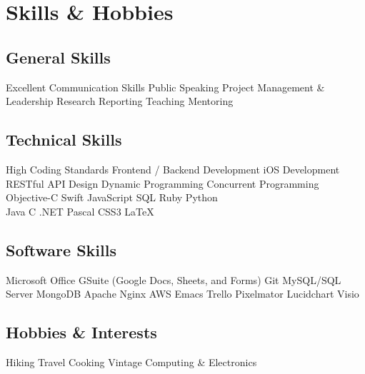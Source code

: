 \vspace{-2\bigskipamount}
\section{Skills \& Hobbies}
\small

\subsection{General Skills}
\chevron{} Excellent Communication Skills
\chevron{} Public Speaking
\chevron{} Project Management \& Leadership
\chevron{} Research
\chevron{} Reporting
\chevron{} Teaching
\chevron{} Mentoring
\medskip

\subsection{Technical Skills}
\chevron{} High Coding Standards
\chevron{} Frontend / Backend Development
\chevron{} iOS Development~
\chevron{} RESTful API Design
\chevron{} Dynamic Programming
\chevron{} Concurrent Programming
\chevron{} Objective-C
\chevron{} Swift
\chevron{} JavaScript
\chevron{} SQL
\chevron{} Ruby
\chevron{} Python
\chevron{} \Csh{}\\
\chevron{} Java
\chevron{} C
\chevron{} \Cpp{}
\chevron{} .NET
\chevron{} Pascal
\chevron{} CSS3
\chevron{} {\rmfamily\LaTeX}
\medskip

\subsection{Software Skills}
\chevron{} Microsoft Office
\chevron{} GSuite (Google Docs, Sheets, and Forms)
\chevron{} Git
\chevron{} MySQL/SQL Server
\chevron{} MongoDB
\chevron{} Apache
\chevron{} Nginx
\chevron{} AWS
\chevron{} Emacs
\chevron{} Trello
\chevron{} Pixelmator
\chevron{} Lucidchart
\chevron{} Visio
\medskip

\subsection{Hobbies \& Interests}
\chevron{} Hiking
\chevron{} Travel
\chevron{} Cooking
\chevron{} Vintage Computing \& Electronics

